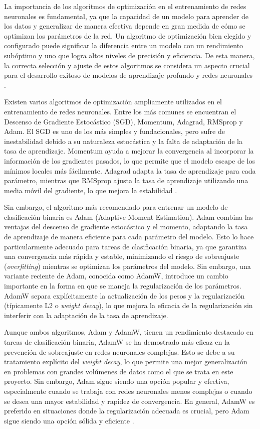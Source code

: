 La importancia de los algoritmos de optimización en el entrenamiento de redes neuronales es fundamental, ya que la capacidad de un modelo para aprender de los datos y generalizar de manera efectiva depende en gran medida de cómo se optimizan los parámetros de la red. Un algoritmo de optimización bien elegido y configurado puede significar la diferencia entre un modelo con un rendimiento subóptimo y uno que logra altos niveles de precisión y eficiencia. De esta manera, la correcta selección y ajuste de estos algoritmos se considera un aspecto crucial para el desarrollo exitoso de modelos de aprendizaje profundo y redes neuronales \cite{goodfellow2016deep}.

Existen varios algoritmos de optimización ampliamente utilizados en el entrenamiento de redes neuronales. Entre los más comunes se encuentran el Descenso de Gradiente Estocástico (SGD), Momentum, Adagrad, RMSprop y Adam. El SGD es uno de los más simples y fundacionales, pero sufre de inestabilidad debido a su naturaleza estocástica y la falta de adaptación de la tasa de aprendizaje. Momentum ayuda a mejorar la convergencia al incorporar la información de los gradientes pasados, lo que permite que el modelo escape de los mínimos locales más fácilmente. Adagrad adapta la tasa de aprendizaje para cada parámetro, mientras que RMSprop ajusta la tasa de aprendizaje utilizando una media móvil del gradiente, lo que mejora la estabilidad \cite{bottou2010large}.

Sin embargo, el algoritmo más recomendado para entrenar un modelo de clasificación binaria es Adam (Adaptive Moment Estimation). Adam combina las ventajas del descenso de gradiente estocástico y el momento, adaptando la tasa de aprendizaje de manera eficiente para cada parámetro del modelo. Esto lo hace particularmente adecuado para tareas de clasificación binaria, ya que garantiza una convergencia más rápida y estable, minimizando el riesgo de sobreajuste (\textit{overfitting}) mientras se optimizan los parámetros del modelo. Sin embargo, una variante reciente de Adam, conocida como AdamW, introduce un cambio importante en la forma en que se maneja la regularización de los parámetros. AdamW separa explícitamente la actualización de los pesos y la regularización (típicamente L2 o \textit{weight decay}), lo que mejora la eficacia de la regularización sin interferir con la adaptación de la tasa de aprendizaje.

Aunque ambos algoritmos, Adam y AdamW, tienen un rendimiento destacado en tareas de clasificación binaria, AdamW se ha demostrado más eficaz en la prevención de sobreajuste en redes neuronales complejas. Esto se debe a su tratamiento explícito del \textit{weight decay}, lo que permite una mejor generalización en problemas con grandes volúmenes de datos como el que se trata en este proyecto. Sin embargo, Adam sigue siendo una opción popular y efectiva, especialmente cuando se trabaja con redes neuronales menos complejas o cuando se desea una mayor estabilidad y rapidez de convergencia. En general, AdamW es preferido en situaciones donde la regularización adecuada es crucial, pero Adam sigue siendo una opción sólida y eficiente \cite{kingma2014adam}.


